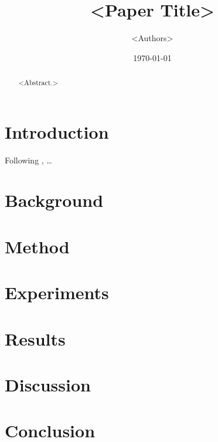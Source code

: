 \documentclass[11pt]{article}
\title{<Paper Title>}
\author{<Authors>}
\date{\today}
\begin{document}
\maketitle

\begin{abstract}
<Abstract.>
\end{abstract}

\section{Introduction}
Following \textcite{thurstone1927}, \dots

\section{Background}

\section{Method}

\section{Experiments}

\section{Results}

\section{Discussion}

\section{Conclusion}

\printbibliography
\end{document}
